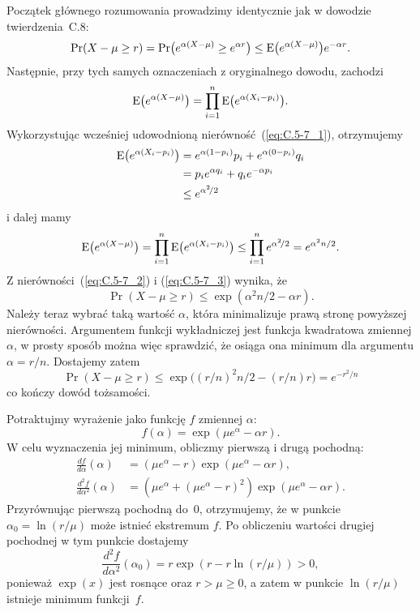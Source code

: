 Początek głównego rozumowania prowadzimy identycznie jak w dowodzie twierdzenia~C.8:
\begin{equation}
	\Pr(X-\mu\ge r) = \Pr\bigl(e^{\alpha(X-\mu)}\ge e^{\alpha r}\bigr) \le \operatorname{E}\bigl(e^{\alpha(X-\mu)}\bigr)e^{-\alpha r}. \label{eq:C.5-7_2}
\end{equation}
Następnie, przy tych samych oznaczeniach z oryginalnego dowodu, zachodzi
\[
	\operatorname{E}\bigl(e^{\alpha(X-\mu)}\bigr) = \prod_{i=1}^n\operatorname{E}\bigl(e^{\alpha(X_i-p_i)}\bigr).
\]
Wykorzystując wcześniej udowodnioną nierówność~(\ref{eq:C.5-7_1}), otrzymujemy
\begin{align*}
	\operatorname{E}\bigl(e^{\alpha(X_i-p_i)}\bigr) &= e^{\alpha(1-p_i)}p_i+e^{\alpha(0-p_i)}q_i \\
	&= p_ie^{\alpha q_i}+q_ie^{-\alpha p_i} \\
	&\le e^{\alpha^2\!/2}
\end{align*}
i dalej mamy
\begin{equation}
	\operatorname{E}\bigl(e^{\alpha(X-\mu)}\bigr) = \prod_{i=1}^n\operatorname{E}\bigl(e^{\alpha(X_i-p_i)}\bigr) \le \prod_{i=1}^ne^{\alpha^2\!/2} = e^{\alpha^2n/2}. \label{eq:C.5-7_3}
\end{equation}
Z nierówności~(\ref{eq:C.5-7_2}) i (\ref{eq:C.5-7_3}) wynika, że
\[
	\Pr(X-\mu\ge r) \le \exp(\alpha^2n/2-\alpha r).
\]
Należy teraz wybrać taką wartość $\alpha$, która minimalizuje prawą stronę powyższej nierówności. Argumentem funkcji wykładniczej jest funkcja kwadratowa zmiennej $\alpha$, w prosty sposób można więc sprawdzić, że osiąga ona minimum dla argumentu $\alpha=r/n$. Dostajemy zatem
\[
	\Pr(X-\mu\ge r) \le \exp\bigl((r/n)^2n/2-(r/n)r\bigr) = e^{-r^2\!/n}
\]
co kończy dowód tożsamości.

\exercise{} %
Potraktujmy wyrażenie jako funkcję $f$ zmiennej $\alpha$:
\[
	f(\alpha) = \exp(\mu e^\alpha-\alpha r).
\]
W celu wyznaczenia jej minimum, obliczmy pierwszą i drugą pochodną:
\begin{align*}
	\frac{df}{d\alpha}(\alpha) &= (\mu e^\alpha-r)\exp(\mu e^\alpha-\alpha r), \\
	\frac{d^2\!f}{d\alpha^2}(\alpha) &= \left(\mu e^\alpha+(\mu e^\alpha-r)^2\right)\exp(\mu e^\alpha-\alpha r).
\end{align*}
Przyrównując pierwszą pochodną do~0, otrzymujemy, że w punkcie $\alpha_0=\ln(r/\mu)$ może istnieć ekstremum $f$. Po obliczeniu wartości drugiej pochodnej w tym punkcie dostajemy
\[
	\frac{d^2\!f}{d\alpha^2}(\alpha_0) = r\exp(r-r\ln(r/\mu)) > 0,
\]
ponieważ $\exp(x)$ jest rosnące oraz $r>\mu\ge0$, a zatem w punkcie $\ln(r/\mu)$ istnieje minimum funkcji~$f$.

